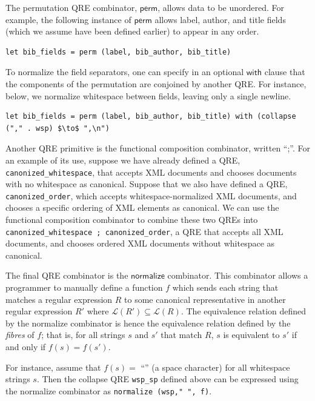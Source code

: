 \documentclass[acmsmall,screen]{acmart}
\newcommand{\kw}[1]{\textcolor{dkblue}{\ensuremath{\mathsf{#1}}}}
\begin{document}
The permutation QRE combinator, \kw{perm}, allows data to be unordered. For example,
the following instance of \kw{perm} allows label, author, and title fields
(which we assume have been defined earlier) to appear in any order.
%
\begin{lstlisting}
let bib_fields = perm (label, bib_author, bib_title)
\end{lstlisting}
%
To normalize the field separators, one can specify 
in an optional \kw{with} clause that the components of the
permutation are conjoined by another QRE. For instance, below, we normalize
whitespace between fields, leaving only a single newline.
%
\begin{lstlisting}
let bib_fields = perm (label, bib_author, bib_title) with (collapse ("," . wsp) $\to$ ",\n")
\end{lstlisting}

Another QRE primitive is the functional composition combinator, written ``;''.
For an example of its use, suppose we have already defined a QRE,
\lstinline{canonized_whitespace}, that accepts XML documents and chooses
documents with no whitespace as canonical. Suppose that we also have defined a
QRE, \lstinline{canonized_order}, which accepts whitespace-normalized XML
documents, and chooses a specific ordering of XML elements as canonical. We can
use the functional composition combinator to combine these two QREs into
\lstinline{canonized_whitespace ; canonized_order}, a QRE that accepts all XML
documents, and chooses ordered XML documents without whitespace as canonical.

The final QRE combinator is the \kw{normalize} combinator. This combinator
allows a programmer to manually define a function $f$ which sends each
string that matches a regular expression $R$ to some canonical
representative in another regular expression $R'$ where $\mathcal{L}(R') 
\subseteq \mathcal{L}(R)$. The equivalence
relation defined by the normalize combinator is hence the equivalence
relation defined by the {\em fibres} of $f$; that is, for all strings
$s$ and $s'$ that match $R$, $s$ is equivalent to $s'$ if and only if
$f(s) = f(s')$.

For instance, assume that $f(s)=$ ``\textvisiblespace'' (a space
character) for all whitespace strings $s$. Then the 
collapse QRE \lstinline{wsp_sp} defined above can
be expressed using the normalize combinator as
\lstinline{normalize (wsp," ", f)}.
\end{document}
